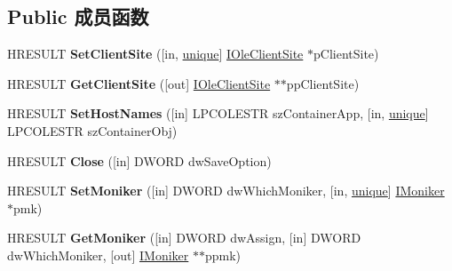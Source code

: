 \subsection*{Public 成员函数}
\begin{DoxyCompactItemize}
\item 
\mbox{\label{interface_i_ole_object_a9b21623a97cf6d74f77a739a3c82963d}} 
H\+R\+E\+S\+U\+LT {\bfseries Set\+Client\+Site} (\mbox{[}in, \hyperlink{interfaceunique}{unique}\mbox{]} \hyperlink{interface_i_ole_client_site}{I\+Ole\+Client\+Site} $\ast$p\+Client\+Site)
\item 
\mbox{\label{interface_i_ole_object_a6b4f4daa95e7411ea41d570ebea09b59}} 
H\+R\+E\+S\+U\+LT {\bfseries Get\+Client\+Site} (\mbox{[}out\mbox{]} \hyperlink{interface_i_ole_client_site}{I\+Ole\+Client\+Site} $\ast$$\ast$pp\+Client\+Site)
\item 
\mbox{\label{interface_i_ole_object_a4ac1929d0c4c91bcd9fddd5a189e88da}} 
H\+R\+E\+S\+U\+LT {\bfseries Set\+Host\+Names} (\mbox{[}in\mbox{]} L\+P\+C\+O\+L\+E\+S\+TR sz\+Container\+App, \mbox{[}in, \hyperlink{interfaceunique}{unique}\mbox{]} L\+P\+C\+O\+L\+E\+S\+TR sz\+Container\+Obj)
\item 
\mbox{\label{interface_i_ole_object_ab23596506be6d1c16419a0495901f461}} 
H\+R\+E\+S\+U\+LT {\bfseries Close} (\mbox{[}in\mbox{]} D\+W\+O\+RD dw\+Save\+Option)
\item 
\mbox{\label{interface_i_ole_object_a195b2dd35177be2278192db3b73b8f51}} 
H\+R\+E\+S\+U\+LT {\bfseries Set\+Moniker} (\mbox{[}in\mbox{]} D\+W\+O\+RD dw\+Which\+Moniker, \mbox{[}in, \hyperlink{interfaceunique}{unique}\mbox{]} \hyperlink{interface_i_moniker}{I\+Moniker} $\ast$pmk)
\item 
\mbox{\label{interface_i_ole_object_a9fcec3db1f6ade98b83125cfc9fcd24e}} 
H\+R\+E\+S\+U\+LT {\bfseries Get\+Moniker} (\mbox{[}in\mbox{]} D\+W\+O\+RD dw\+Assign, \mbox{[}in\mbox{]} D\+W\+O\+RD dw\+Which\+Moniker, \mbox{[}out\mbox{]} \hyperlink{interface_i_moniker}{I\+Moniker} $\ast$$\ast$ppmk)
\item 
\mbox{\label{interface_i_ole_object_ae86dd3988a58a284070f900bff263649}} 

\end{DoxyCompactItemize}
